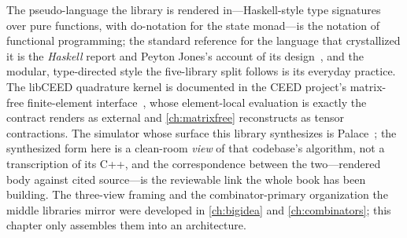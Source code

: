 \furtherreading
The pseudo-language the library is rendered in---Haskell-style type signatures over
pure functions, with do-notation for the state monad---is the notation of functional
programming; the standard reference for the language that crystallized it is the
\emph{Haskell} report and Peyton Jones's account of its design~\citep{peytonjones2003},
and the modular, type-directed style the five-library split follows is its everyday
practice. The  libCEED quadrature kernel is documented in the CEED
project's matrix-free finite-element interface~\citep{ceed2021}, whose element-local
evaluation is exactly the contract  renders as external and
\cref{ch:matrixfree} reconstructs as tensor contractions. The simulator whose surface
this library synthesizes is Palace~\citep{palace2023}; the synthesized form here is a
clean-room \emph{view} of that codebase's algorithm, not a transcription of its C++,
and the correspondence between the two---rendered body against cited source---is the
reviewable link the whole book has been building. The three-view framing and the
combinator-primary organization the middle libraries mirror were developed in
\cref{ch:bigidea} and \cref{ch:combinators}; this chapter only assembles them into an
architecture.


